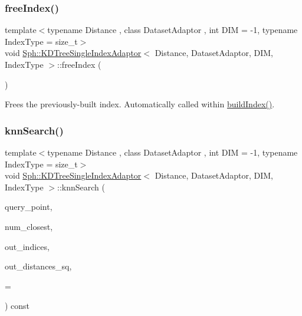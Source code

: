 \subsubsection{\texorpdfstring{free\+Index()}{freeIndex()}}
{\footnotesize\ttfamily template$<$typename Distance , class Dataset\+Adaptor , int D\+IM = -\/1, typename Index\+Type  = size\+\_\+t$>$ \\
void \hyperlink{classSph_1_1KDTreeSingleIndexAdaptor}{Sph\+::\+K\+D\+Tree\+Single\+Index\+Adaptor}$<$ Distance, Dataset\+Adaptor, D\+IM, Index\+Type $>$\+::free\+Index (\begin{DoxyParamCaption}{ }\end{DoxyParamCaption})\hspace{0.3cm}{\ttfamily [inline]}}

Frees the previously-\/built index. Automatically called within \hyperlink{classSph_1_1KDTreeSingleIndexAdaptor_a9806520fd7f6a35557d4c52043459358}{build\+Index()}. \hypertarget{classSph_1_1KDTreeSingleIndexAdaptor_ab2712a5eafbf9344143d2eadff15e802}{}\label{classSph_1_1KDTreeSingleIndexAdaptor_ab2712a5eafbf9344143d2eadff15e802} 
\subsubsection{\texorpdfstring{knn\+Search()}{knnSearch()}}
{\footnotesize\ttfamily template$<$typename Distance , class Dataset\+Adaptor , int D\+IM = -\/1, typename Index\+Type  = size\+\_\+t$>$ \\
void \hyperlink{classSph_1_1KDTreeSingleIndexAdaptor}{Sph\+::\+K\+D\+Tree\+Single\+Index\+Adaptor}$<$ Distance, Dataset\+Adaptor, D\+IM, Index\+Type $>$\+::knn\+Search (\begin{DoxyParamCaption}\item[{const Element\+Type $\ast$}]{query\+\_\+point,  }\item[{const size\+\_\+t}]{num\+\_\+closest,  }\item[{Index\+Type $\ast$}]{out\+\_\+indices,  }\item[{Distance\+Type $\ast$}]{out\+\_\+distances\+\_\+sq,  }\item[{const int}]{ = {} }\end{DoxyParamCaption}) const\hspace{0.3cm}{\ttfamily [inline]}}

